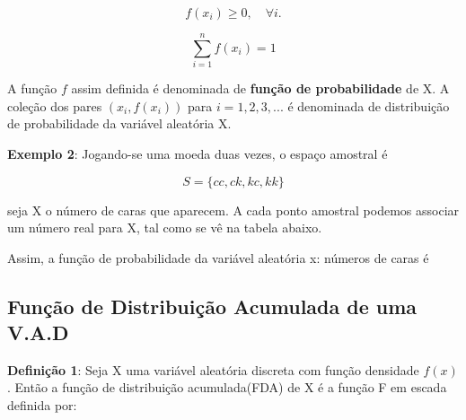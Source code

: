 \documentclass[a4paper,12pt]{report}
\begin{document}
{$$
f(x_{i}) \geq 0, \quad \forall i.
$$

$$
\sum_{i=1}^{n}f(x_{i})=1
$$


A função $f$ assim definida é denominada de \textbf{função de
probabilidade} de X. A coleção dos pares $(x_{i}, f(x_{i}))$ para
$i=1,2,3,...$ é denominada de distribuição de probabilidade da
variável aleatória X.\vskip0.3cm

\textbf{Exemplo 2}: Jogando-se uma moeda duas vezes, o espaço
amostral é

$$
S= \{ cc, ck, kc, kk \}
$$

seja X o número de caras que aparecem. A cada ponto amostral
podemos associar um número real para X, tal como se vê na tabela
abaixo.




\begin{table}[!htb]
\end{table}



Assim, a função de probabilidade da variável aleatória x: números
de caras é

\begin{table}[!htb]
\end{table}


\subsection{Função de Distribuição Acumulada de uma V.A.D}

\textbf{Definição 1}: Seja X uma variável aleatória discreta com
função densidade $f(x)$. Então a função de distribuição
acumulada(FDA) de X é a função F em escada definida por:

}
\end{document}
